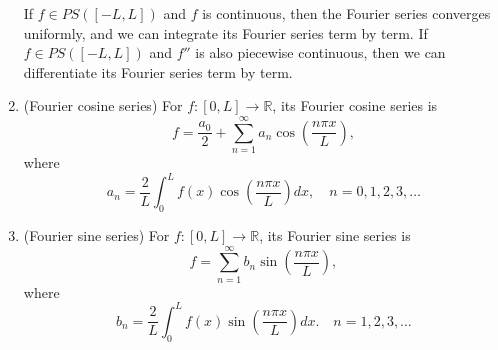 \documentclass[a4paper]{article}
\theoremstyle{definition}
\numberwithin{equation}{section}
\begin{document}
\begin{enumerate}
If $f\in PS([-L, L])$ and $f$ is continuous, then the Fourier series converges uniformly, and we can integrate its Fourier series term by term.  If $f\in PS([-L, L])$ and $f''$ is also piecewise continuous, then we can differentiate its Fourier series term by term.

\item (Fourier cosine series)  For $f: [0,L]\to \mathbb R$, its Fourier cosine series is
	\[f=\frac{a_0}{2}+\sum_{n=1}^\infty a_n\cos \left(\frac{n\pi x}{L}\right),\]
	where
			\[a_n=\frac{2}{L}\int_{0}^L f(x)	\cos \left(\frac{n\pi x}{L}\right)dx,\quad {n=0,1,2,3,\ldots}\]	
			
\item (Fourier sine series)  For $f:[0,L]\to \mathbb R$, its Fourier sine series is
				\[f=\sum_{n=1}^\infty b_n\sin \left(\frac{n\pi x}{L}\right),\]
			where
			\[b_{n}=\frac{2}{L}\int_{0}^L f(x)	\sin \left(\frac{n\pi x}{L}\right)dx.\quad {n=1,2,3,\ldots} \]	
			

\end{enumerate}
\end{document}
